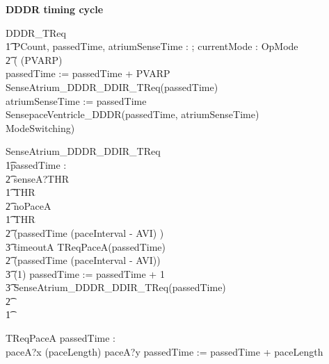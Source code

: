 \textbf{DDDR timing cycle}

\begin{circusaction}
DDDR\_TReq \circdef \\
\t1 \circvres PCount, passedTime, atriumSenseTime : \nat; \circvres currentMode : OpMode \\
  \t2 \circspot (
  \circwait(PVARP) \circseq \\
   passedTime := passedTime + PVARP \circseq \\
   SenseAtrium\_DDDR\_DDIR\_TReq(passedTime) \circseq \\
   atriumSenseTime := passedTime \circseq \\
   SensepaceVentricle\_DDDR(passedTime, atriumSenseTime) \circseq \\  
   ModeSwitching) \\ 
\end{circusaction}


\begin{circusaction}
SenseAtrium\_DDDR\_DDIR\_TReq \circdef \\
\t1\circvres passedTime : \nat \\
\t2 \circspot senseA?THR \then \\
\t1 \circif  THR  \circthen\\
\t2 noPaceA \then \Skip \\
\t1 \circelse \lnot  THR  \circthen\\
\t2 \circif  (passedTime \geq (paceInterval - AVI) ) \circthen \\
\t3 timeoutA \then TReqPaceA(passedTime) \\
\t2 \circelse \lnot (passedTime \geq (paceInterval - AVI)) \circthen \\
\t3 \circwait(1) \circseq passedTime := passedTime + 1 \circseq\\
\t3 SenseAtrium\_DDDR\_DDIR\_TReq(passedTime) \\
\t2 \circfi\\ 
\t1 \circfi \\ 
\end{circusaction}

\begin{circusaction}
	TReqPaceA \circdef \circvres passedTime : \nat \circspot \\
	paceA?x \then \circwait(paceLength) \circseq paceA?y \then passedTime := passedTime + paceLength 
\end{circusaction}



